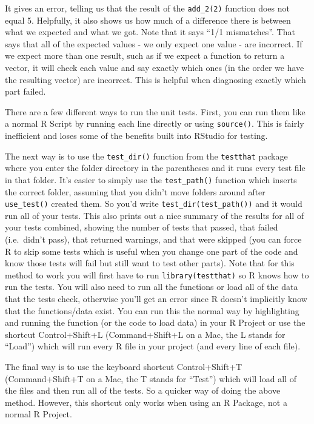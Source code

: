 \documentclass[
  12pt,
]{book}
\begin{document}
It gives an error, telling us that the result of the \texttt{add\_2(2)} function does not equal 5. Helpfully, it also shows us how much of a difference there is between what we expected and what we got. Note that it says ``1/1 mismatches''. That says that all of the expected values - we only expect one value - are incorrect. If we expect more than one result, such as if we expect a function to return a vector, it will check each value and say exactly which ones (in the order we have the resulting vector) are incorrect. This is helpful when diagnosing exactly which part failed.

There are a few different ways to run the unit tests. First, you can run them like a normal R Script by running each line directly or using \texttt{source()}. This is fairly inefficient and loses some of the benefits built into RStudio for testing.

The next way is to use the \texttt{test\_dir()} function from the \texttt{testthat} package where you enter the folder directory in the parentheses and it runs every test file in that folder. It's easier to simply use the \texttt{test\_path()} function which inserts the correct folder, assuming that you didn't move folders around after \texttt{use\_test()} created them. So you'd write \texttt{test\_dir(test\_path())} and it would run all of your tests. This also prints out a nice summary of the results for all of your tests combined, showing the number of tests that passed, that failed (i.e.~didn't pass), that returned warnings, and that were skipped (you can force R to skip some tests which is useful when you change one part of the code and know those tests will fail but still want to test other parts). Note that for this method to work you will first have to run \texttt{library(testthat)} so R knows how to run the tests. You will also need to run all the functions or load all of the data that the tests check, otherwise you'll get an error since R doesn't implicitly know that the functions/data exist. You can run this the normal way by highlighting and running the function (or the code to load data) in your R Project or use the shortcut Control+Shift+L (Command+Shift+L on a Mac, the L stands for ``Load'') which will run every R file in your project (and every line of each file).

The final way is to use the keyboard shortcut Control+Shift+T (Command+Shift+T on a Mac, the T stands for ``Test'') which will load all of the files and then run all of the tests. So a quicker way of doing the above method. However, this shortcut only works when using an R Package, not a normal R Project.
\end{document}

